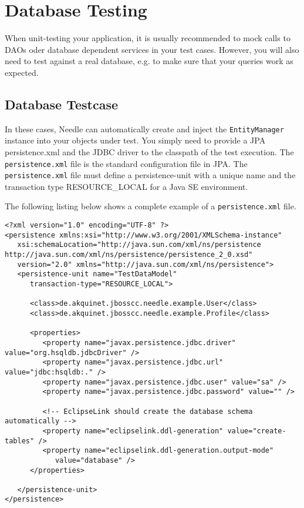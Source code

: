 \chapter{Database Testing}

When unit-testing your application, it is usually recommended to mock calls to DAOs oder database dependent services in your test cases.
However, you will also need to test against a real database, e.g. to make sure that your queries work as expected. 

\section{Database Testcase}

In these cases, Needle can automatically create and inject the \verb|EntityManager| instance into your objects under test. 
You simply need to provide a JPA persistence.xml and the JDBC driver to the classpath of the test execution. 
The \verb|persistence.xml| file is the standard configuration file in JPA. The \verb|persistence.xml| file must define a persistence-unit with a unique name and the transaction type RESOURCE\_LOCAL for a Java SE environment. 

The following listing below shows a complete example of a \verb|persistence.xml| file. 

\begin{lstlisting}[caption=test persistence.xml]
<?xml version="1.0" encoding="UTF-8" ?>
<persistence xmlns:xsi="http://www.w3.org/2001/XMLSchema-instance"
   xsi:schemaLocation="http://java.sun.com/xml/ns/persistence http://java.sun.com/xml/ns/persistence/persistence_2_0.xsd"
   version="2.0" xmlns="http://java.sun.com/xml/ns/persistence">
   <persistence-unit name="TestDataModel"
      transaction-type="RESOURCE_LOCAL">

      <class>de.akquinet.jbosscc.needle.example.User</class>
      <class>de.akquinet.jbosscc.needle.example.Profile</class>

      <properties>
         <property name="javax.persistence.jdbc.driver" value="org.hsqldb.jdbcDriver" />
         <property name="javax.persistence.jdbc.url" value="jdbc:hsqldb:." />
         <property name="javax.persistence.jdbc.user" value="sa" />
         <property name="javax.persistence.jdbc.password" value="" />

         <!-- EclipseLink should create the database schema automatically -->
         <property name="eclipselink.ddl-generation" value="create-tables" />
         <property name="eclipselink.ddl-generation.output-mode"
            value="database" />
      </properties>

   </persistence-unit>
</persistence>
\end{lstlisting}

